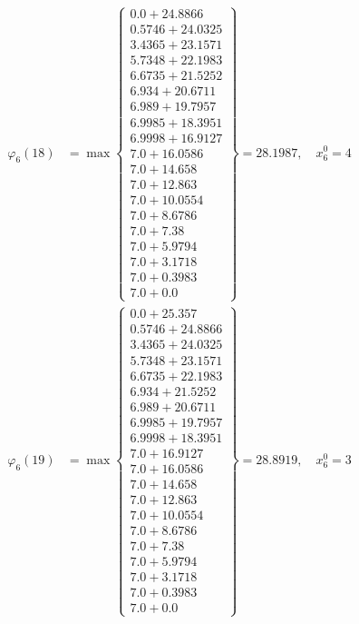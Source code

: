 \documentclass{article}
\begin{document}
\begin{align*}
\varphi_{6}(18) &= \max \left\{ \begin{array}{c}
0.0 + 24.8866 \\
 0.5746 + 24.0325 \\
 3.4365 + 23.1571 \\
 5.7348 + 22.1983 \\
 6.6735 + 21.5252 \\
 6.934 + 20.6711 \\
 6.989 + 19.7957 \\
 6.9985 + 18.3951 \\
 6.9998 + 16.9127 \\
 7.0 + 16.0586 \\
 7.0 + 14.658 \\
 7.0 + 12.863 \\
 7.0 + 10.0554 \\
 7.0 + 8.6786 \\
 7.0 + 7.38 \\
 7.0 + 5.9794 \\
 7.0 + 3.1718 \\
 7.0 + 0.3983 \\
 7.0 + 0.0
\end{array} \right\}=28.1987, \quad x_{6}^0=4\\
  
\varphi_{6}(19) &= \max \left\{ \begin{array}{c}
0.0 + 25.357 \\
 0.5746 + 24.8866 \\
 3.4365 + 24.0325 \\
 5.7348 + 23.1571 \\
 6.6735 + 22.1983 \\
 6.934 + 21.5252 \\
 6.989 + 20.6711 \\
 6.9985 + 19.7957 \\
 6.9998 + 18.3951 \\
 7.0 + 16.9127 \\
 7.0 + 16.0586 \\
 7.0 + 14.658 \\
 7.0 + 12.863 \\
 7.0 + 10.0554 \\
 7.0 + 8.6786 \\
 7.0 + 7.38 \\
 7.0 + 5.9794 \\
 7.0 + 3.1718 \\
 7.0 + 0.3983 \\
 7.0 + 0.0
\end{array} \right\}=28.8919, \quad x_{6}^0=3\\
  

\end{align*}
\end{document}
